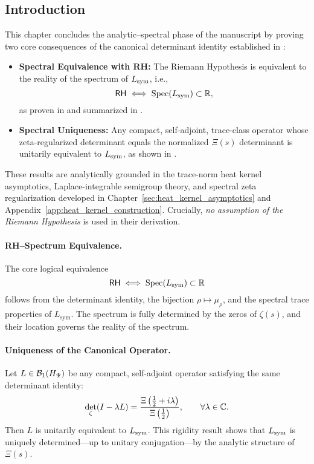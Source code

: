 \subsection*{Introduction}
\label{sec:intro_spectral_implications}

This chapter concludes the analytic–spectral phase of the manuscript by proving two core consequences of the canonical determinant identity established in :

\begin{itemize}
  \item \textbf{Spectral Equivalence with RH:} The Riemann Hypothesis is equivalent to the reality of the spectrum of \( L_{\mathrm{sym}} \), i.e.,
  \[
  \mathsf{RH} \iff \operatorname{Spec}(L_{\mathrm{sym}}) \subset \mathbb{R},
  \]
  as proven in  and summarized in .
  
  \item \textbf{Spectral Uniqueness:} Any compact, self-adjoint, trace-class operator whose zeta-regularized determinant equals the normalized \( \Xi(s) \) determinant is unitarily equivalent to \( L_{\mathrm{sym}} \), as shown in .
\end{itemize}

These results are analytically grounded in the trace-norm heat kernel asymptotics, Laplace-integrable semigroup theory, and spectral zeta regularization developed in Chapter~\ref{sec:heat_kernel_asymptotics} and Appendix~\ref{app:heat_kernel_construction}. Crucially, \textit{no assumption of the Riemann Hypothesis} is used in their derivation.

\paragraph{RH–Spectrum Equivalence.}
The core logical equivalence
\[
\mathsf{RH} \iff \operatorname{Spec}(L_{\mathrm{sym}}) \subset \mathbb{R}
\]
follows from the determinant identity, the bijection \( \rho \mapsto \mu_\rho \), and the spectral trace properties of \( L_{\mathrm{sym}} \). The spectrum is fully determined by the zeros of \( \zeta(s) \), and their location governs the reality of the spectrum.

\paragraph{Uniqueness of the Canonical Operator.}
Let \( L \in \mathcal{B}_1(H_{\Psi}) \) be any compact, self-adjoint operator satisfying the same determinant identity:
\[
\det_\zeta(I - \lambda L) = \frac{\Xi\left(\tfrac{1}{2} + i\lambda\right)}{\Xi\left(\tfrac{1}{2}\right)}, \qquad \forall \lambda \in \mathbb{C}.
\]
Then \( L \) is unitarily equivalent to \( L_{\mathrm{sym}} \). This rigidity result shows that \( L_{\mathrm{sym}} \) is uniquely determined—up to unitary conjugation—by the analytic structure of \( \Xi(s) \).

